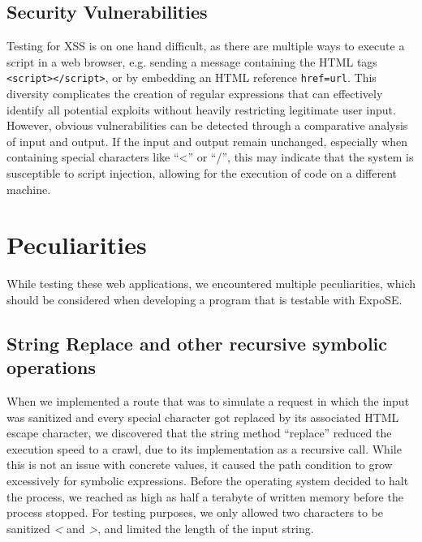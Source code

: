 \subsection{Security Vulnerabilities}
Testing for XSS is on one hand difficult, as there are multiple ways to execute a script in a web browser,
e.g. sending a message containing the HTML tags \lstinline{<script></script>}, 
or by embedding an HTML reference \lstinline{href=url}. 
This diversity complicates the creation of regular expressions that can effectively identify 
all potential exploits without heavily restricting legitimate user input.
However, obvious vulnerabilities can be detected through a comparative analysis of input and output.
If the input and output remain unchanged, especially when containing special characters like “\textless” or “/”,
this may indicate that the system is susceptible to script injection, allowing for the execution of code on a different machine.


\section{Peculiarities}
\label{sec:peculiarities}
While testing these web applications, we encountered multiple peculiarities, which should be considered when developing a program that is testable with ExpoSE.
\subsection{String Replace and other recursive symbolic operations}
When we implemented a route that was to simulate a request in which the input was sanitized and every special character got replaced by its associated HTML escape character, we discovered that the string method “replace” reduced the execution speed to a crawl, due to its implementation as a recursive call.
While this is not an issue with concrete values, it caused the path condition to grow excessively for symbolic expressions. Before the operating system decided to halt the process, we reached as high as half a terabyte of written memory before the process stopped. For testing purposes, we only allowed two
characters to be sanitized \textit{\textless} and \textit{\textgreater}, and limited the length of the input string. 


